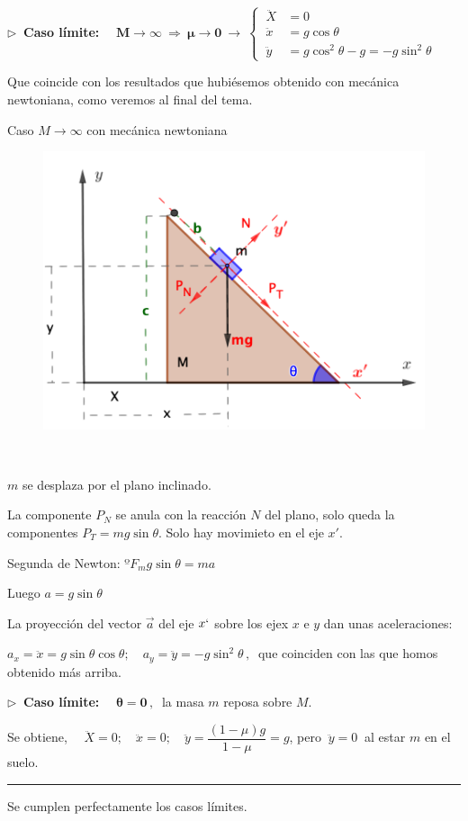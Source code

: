 $\boldsymbol \triangleright \ $ \textbf{Caso límite:} $\boldsymbol{\quad M\to \infty \ \Rightarrow \ \mu \to 0} \ \longrightarrow \ \begin{cases}
 \ \ddot X &=0 \\ \ \ddot x &= g \cos \theta \\ \ \ddot y &=g \cos^2 \theta - g =-g\sin^2 \theta	
 \end{cases}$ 
 
 Que coincide con los resultados que hubiésemos obtenido con mecánica newtoniana, como veremos al final del tema.
 
  \vspace{5mm}
  
\begin{myexampleblock}{Caso $M\to \infty$ con mecánica newtoniana}
 	
 	\begin{multicols}{2}
\begin{figure}[H]
	\centering
	\includegraphics[width=.45\textwidth]{imagenes/img10-02.png}
\end{figure}	
$\,$

$m$ se desplaza por el plano inclinado.

La componente $P_N$ se anula con la reacción $N$ del plano, solo queda la componentes $P_T=mg\sin \theta$. Solo hay movimieto en el eje $x'$.

Segunda de Newton: $º F_mg\sin \theta = ma$

Luego $a=g\sin \theta$

La proyección del vector $\vec a$ del eje $x`$ sobre los ejex $x$ e $y$ dan unas aceleraciones:
\end{multicols}
$a_x=\ddot x= g\sin \theta \cos \theta;\quad a_y=\ddot y= -g\sin^2 \theta\, , \ $ que coinciden con las que homos obtenido más arriba.
 \end{myexampleblock}
 
\vspace{1cm}
  

$\boldsymbol \triangleright \ $ \textbf{Caso límite:} $\quad \boldsymbol{\theta = 0}\, , \ $ la masa $m$ reposa sobre $M$.

Se obtiene, $\quad \ddot X=0;\quad \ddot x=0;\quad \ddot y=\dfrac{(1-\mu)g}{1-\mu}=g$, pero $\ \ddot y=0 \ $ al estar $m$ en el suelo.

\rule{200pt}{0.1pt}

Se cumplen perfectamente los casos límites.


 
 


